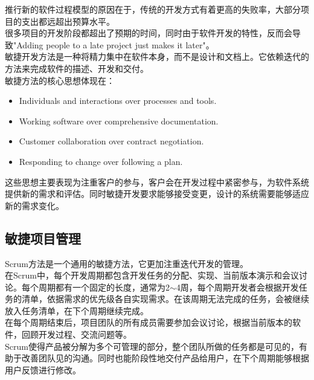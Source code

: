 推行新的软件过程模型的原因在于，传统的开发方式有着更高的失败率，大部分项目的支出都远超出预算水平。\\

很多项目的开发阶段都超出了预期的时间，同时由于软件开发的特性，反而会导致"Adding people to a late project just makes it later"。\\

敏捷开发方法是一种将精力集中在软件本身，而不是设计和文档上。它依赖迭代的方法来完成软件的描述、开发和交付。\\

敏捷方法的核心思想体现在：

\begin{itemize}
    \item Individuals and interactions over processes and tools.
    \item Working software over comprehensive documentation.
    \item Customer collaboration over contract negotiation.
    \item Responding to change over following a plan.
\end{itemize}

这些思想主要表现为注重客户的参与，客户会在开发过程中紧密参与，为软件系统提供新的需求和评估。同时敏捷开发要求能够接受变更，设计的系统需要能够适应新的需求变化。\\

\subsection{敏捷项目管理}

Scrum方法是一个通用的敏捷方法，它更加注重迭代开发的管理。\\

在Scrum中，每个开发周期都包含开发任务的分配、实现、当前版本演示和会议讨论。每个周期都有一个固定的长度，通常为2$ \sim $4周，每个周期开发者会根据开发任务的清单，依据需求的优先级各自实现需求。在该周期无法完成的任务，会被继续放入任务清单，在下个周期继续完成。\\

在每个周期结束后，项目团队的所有成员需要参加会议讨论，根据当前版本的软件，回顾开发过程、交流问题等。\\

Scrum使得产品被分解为多个可管理的部分，整个团队所做的任务都是可见的，有助于改善团队见的沟通。同时也能阶段性地交付产品给用户，在下个周期能够根据用户反馈进行修改。

\newpage
